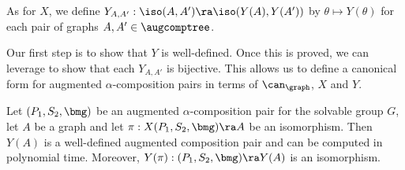 As for $X$, we define $Y_{A, A'} : \iso(A, A') \ra \iso(Y(A), Y(A'))$ by $\theta \mapsto Y(\theta)$ for each pair of graphs $A, A' \in \augcomptree$.

Our first step is to show that $Y$ is well-defined.  Once this is proved, we can leverage  to show that each $Y_{A, A'}$ is bijective.  This allows us to define a canonical form for augmented $\alpha$-composition pairs in terms of $\can_{\graph}$, $X$ and $Y$.

\begin{lemma}
  \label{lem:Y-well-def}
  Let $(P_1, S_2, \bmg)$ be an augmented $\alpha$-composition pair for the solvable group $G$, let $A$ be a graph and let $\pi : X(P_1, S_2, \bmg) \ra A$ be an isomorphism.  Then $Y(A)$ is a well-defined augmented composition pair and can be computed in polynomial time.  Moreover, $Y(\pi) : (P_1, S_2, \bmg) \ra Y(A)$ is an isomorphism.
\end{lemma}

